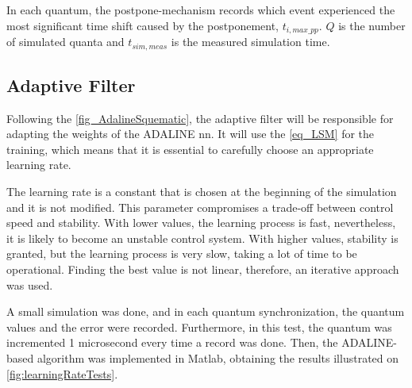 In each quantum, the postpone-mechanism records which event experienced the most significant time shift caused by the postponement, 
$t_{i,max\_pp}$. $Q$ is the number of simulated quanta and $t_{sim,meas}$ is the measured simulation time. 


\subsection{Adaptive Filter}

Following the \autoref{fig_AdalineSquematic}, the adaptive filter will be responsible for adapting the weights of the ADALINE \gls{nn}. It will use 
the \autoref{eq_LSM} for the training, which means that it is essential to carefully choose an appropriate learning rate.

The learning rate is a constant that is chosen at the beginning of the simulation and it is not modified. This parameter compromises a trade-off 
between control speed and stability. With lower values, the learning process is fast, nevertheless, it is likely to become an unstable control 
system. With higher values, stability is granted, but the learning process is very slow, taking a lot of time to be operational.
Finding the best value is not linear, therefore, an iterative approach was used. 

A small simulation was done, and in each quantum synchronization, the quantum values and the error were recorded. Furthermore, 
in this test, the quantum was incremented 1 microsecond every time a record was done. Then, the ADALINE-based algorithm was implemented in Matlab, 
obtaining the results illustrated on \autoref{fig:learningRateTests}.

